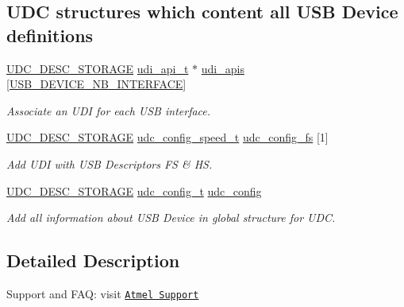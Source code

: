 \subsection*{U\-D\-C structures which content all U\-S\-B Device definitions}
\begin{DoxyCompactItemize}
\item 
\hyperlink{group__udc__desc__group_gae086959cec07a2e71ab069e25a51764f}{U\-D\-C\-\_\-\-D\-E\-S\-C\-\_\-\-S\-T\-O\-R\-A\-G\-E} \hyperlink{structudi__api__t}{udi\-\_\-api\-\_\-t} $\ast$ \hyperlink{group__udi__cdc__group__single__desc_ga5356b021bc068e4b564577e38b44ba0e}{udi\-\_\-apis} \mbox{[}\hyperlink{group__udi__cdc__group__single__desc_gad079423a5116ebac5e26628447e0d0c1}{U\-S\-B\-\_\-\-D\-E\-V\-I\-C\-E\-\_\-\-N\-B\-\_\-\-I\-N\-T\-E\-R\-F\-A\-C\-E}\mbox{]}
\begin{DoxyCompactList}\small\item\em Associate an U\-D\-I for each U\-S\-B interface. \end{DoxyCompactList}\item 
\hyperlink{group__udc__desc__group_gae086959cec07a2e71ab069e25a51764f}{U\-D\-C\-\_\-\-D\-E\-S\-C\-\_\-\-S\-T\-O\-R\-A\-G\-E} \hyperlink{structudc__config__speed__t}{udc\-\_\-config\-\_\-speed\-\_\-t} \hyperlink{group__udi__cdc__group__single__desc_ga5db6d631eea81d0c57ac6fde3a4963a1}{udc\-\_\-config\-\_\-fs} \mbox{[}1\mbox{]}
\begin{DoxyCompactList}\small\item\em Add U\-D\-I with U\-S\-B Descriptors F\-S \& H\-S. \end{DoxyCompactList}\item 
\hyperlink{group__udc__desc__group_gae086959cec07a2e71ab069e25a51764f}{U\-D\-C\-\_\-\-D\-E\-S\-C\-\_\-\-S\-T\-O\-R\-A\-G\-E} \hyperlink{structudc__config__t}{udc\-\_\-config\-\_\-t} \hyperlink{group__udi__cdc__group__single__desc_ga40ae5a61fbfa7e289136b2f9fd190217}{udc\-\_\-config}
\begin{DoxyCompactList}\small\item\em Add all information about U\-S\-B Device in global structure for U\-D\-C. \end{DoxyCompactList}\end{DoxyCompactItemize}


\subsection{Detailed Description}
Support and F\-A\-Q\-: visit \href{http://www.atmel.com/design-support/}{\tt Atmel Support}

